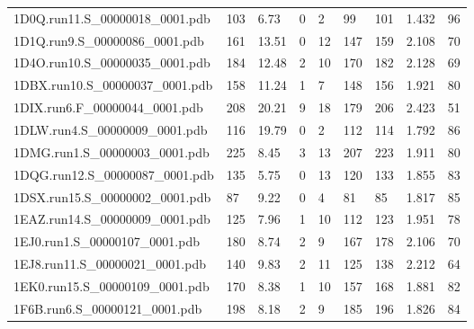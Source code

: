 \documentclass{bioinfo}
\begin{document}
\begin{table}[!t]
{\begin{tabular}{lllllllll}
    1D0Q.run11.S\_00000018\_0001.pdb & 103      & 6.73       & 0           & 2           & 99          & 101     & 1.432           & 96           \\
    1D1Q.run9.S\_00000086\_0001.pdb & 161      & 13.51      & 0           & 12          & 147         & 159     & 2.108           & 70           \\
    1D4O.run10.S\_00000035\_0001.pdb & 184      & 12.48      & 2           & 10          & 170         & 182     & 2.128           & 69           \\
    1DBX.run10.S\_00000037\_0001.pdb & 158      & 11.24      & 1           & 7           & 148         & 156     & 1.921           & 80           \\
    1DIX.run6.F\_00000044\_0001.pdb & 208      & 20.21      & 9           & 18          & 179         & 206     & 2.423           & 51           \\
    1DLW.run4.S\_00000009\_0001.pdb & 116      & 19.79      & 0           & 2           & 112         & 114     & 1.792           & 86           \\
    1DMG.run1.S\_00000003\_0001.pdb & 225      & 8.45       & 3           & 13          & 207         & 223     & 1.911           & 80           \\
    1DQG.run12.S\_00000087\_0001.pdb & 135      & 5.75       & 0           & 13          & 120         & 133     & 1.855           & 83           \\
    1DSX.run15.S\_00000002\_0001.pdb & 87       & 9.22       & 0           & 4           & 81          & 85      & 1.817           & 85           \\
    1EAZ.run14.S\_00000009\_0001.pdb & 125      & 7.96       & 1           & 10          & 112         & 123     & 1.951           & 78           \\
    1EJ0.run1.S\_00000107\_0001.pdb & 180      & 8.74       & 2           & 9           & 167         & 178     & 2.106           & 70           \\
    1EJ8.run11.S\_00000021\_0001.pdb & 140      & 9.83       & 2           & 11          & 125         & 138     & 2.212           & 64           \\
    1EK0.run15.S\_00000109\_0001.pdb & 170      & 8.38       & 1           & 10          & 157         & 168     & 1.881           & 82           \\
    1F6B.run6.S\_00000121\_0001.pdb & 198      & 8.18       & 2           & 9           & 185         & 196     & 1.826           & 84           \\

\end{tabular}}
\end{table}
\end{document}
